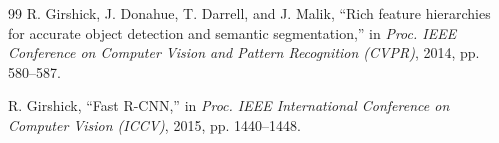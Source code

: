 \documentclass[conference]{IEEEtran}
\begin{document}
\begin{thebibliography}{99}
R. Girshick, J. Donahue, T. Darrell, and J. Malik, ``Rich feature hierarchies for accurate object detection and semantic segmentation,'' in \textit{Proc. IEEE Conference on Computer Vision and Pattern Recognition (CVPR)}, 2014, pp. 580--587.

R. Girshick, ``Fast R-CNN,'' in \textit{Proc. IEEE International Conference on Computer Vision (ICCV)}, 2015, pp. 1440--1448.

\end{thebibliography}
\end{document}
